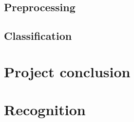 \documentclass[11pt,a4paper,UKenglish]{article}
\begin{document}
\subsection{Preprocessing}
\subsection{Classification}

\section{Project conclusion}

\section{Recognition}




\end{document}
